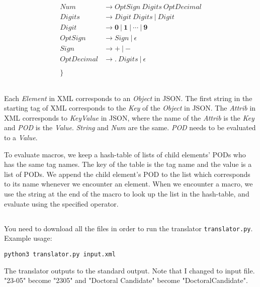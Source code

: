 \documentclass{article}
\begin{document}
\begin{align*}
	\\
	\mathit{Num}        & \rightarrow \mathit{OptSign} ~ \mathit{Digits} ~ \mathit{OptDecimal} \\
	\mathit{Digits}     & \rightarrow \mathit{Digit} ~ \mathit{Digits} ~|~ \mathit{Digit}      \\
	\mathit{Digit}      & \rightarrow \mathbf{0} ~|~ \mathbf{1} ~|~ \cdots ~|~ \mathbf{9}      \\
	\mathit{OptSign}    & \rightarrow \mathit{Sign} ~|~ \epsilon                               \\
	\mathit{Sign}       & \rightarrow \boldsymbol{+} ~|~ \boldsymbol{-}                        \\
	\mathit{OptDecimal} & \rightarrow \boldsymbol{.} ~ \mathit{Digits} ~|~ \epsilon            \\
	\\
	\}
\end{align*}

\subsection{}
Each \textit{Element} in XML corresponds to an \textit{Object}
in JSON. The first string in the starting tag of XML corresponds to the
\textit{Key} of the \textit{Object} in JSON. The
\textit{Attrib} in XML corresponds to \textit{KeyValue} in JSON,
where the name of the \textit{Attrib} is the \textit{Key}
and \textit{POD} is the \textit{Value}.
\textit{String} and \textit{Num} are the same.
\textit{POD} needs to be evaluated to a \textit{Value}.

To evaluate macros, we keep a hash-table of lists of child elements' PODs who
has the same tag names. The key of the table is the tag name and the value is a
list of PODs. We append the child element's POD to the list which corresponds
to its name whenever we encounter an element.  When we encounter a macro, we
use the string at the end of the macro to look up
the list in the hash-table, and evaluate using the specified operator.

\subsection{}
You need to download all the files in order to run the translator
\lstinline{translator.py}. Example usage:

\lstinline{python3 translator.py input.xml}

The translator outputs to the standard output. Note that I changed to input
file. "23-05" become "2305" and "Doctoral Candidate" become
"DoctoralCandidate".
\end{document}
